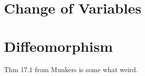 \section{Change of Variables}
\TODO
\section{Diffeomorphism}

\TODO Thm 17.1 from Munkers is some what weird.


